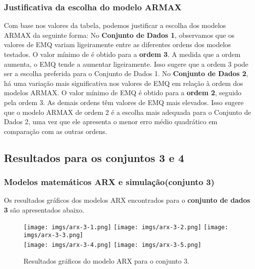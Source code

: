 \documentclass[a4paper,12pt]{article}
\begin{document}
\subsubsection{Justificativa da escolha do modelo ARMAX}

Com base nos valores da tabela, podemos justificar a escolha dos modelos ARMAX da seguinte forma: No \textbf{Conjunto de Dados 1}, observamos que os valores de EMQ variam ligeiramente entre as diferentes ordens dos modelos testados. O valor mínimo de é obtido para a \textbf{ordem 3}. A medida que a ordem aumenta, o EMQ tende a aumentar ligeiramente. Isso sugere que a ordem 3 pode ser a escolha preferida para o Conjunto de Dados 1. No \textbf{Conjunto de Dados 2}, há uma variação mais significativa nos valores de EMQ em relação à ordem dos modelos ARMAX. O valor mínimo de EMQ é obtido para a \textbf{ordem 2}, seguido pela ordem 3. As demais ordens têm valores de EMQ mais elevados. Isso sugere que o modelo ARMAX de ordem 2 é a escolha mais adequada para o Conjunto de Dados 2, uma vez que ele apresenta o menor erro médio quadrático em comparação com as outras ordens.

\subsection{Resultados para os conjuntos 3 e 4}

\subsubsection{Modelos matemáticos ARX e simulação(conjunto 3)}

Os resultados gráficos dos modelos ARX encontrados para o \textbf{conjunto de dados 3} são apresentados abaixo.

\begin{figure}[h!]
\centering

\texttt{[image: imgs/arx-3-1.png]} \quad
\texttt{[image: imgs/arx-3-2.png]} \quad
\texttt{[image: imgs/arx-3-3.png]} \\

\texttt{[image: imgs/arx-3-4.png]} \quad
\texttt{[image: imgs/arx-3-5.png]}

\caption{Resultados gráficos do modelo ARX para o conjunto 3.}
\end{figure}
\end{document}
